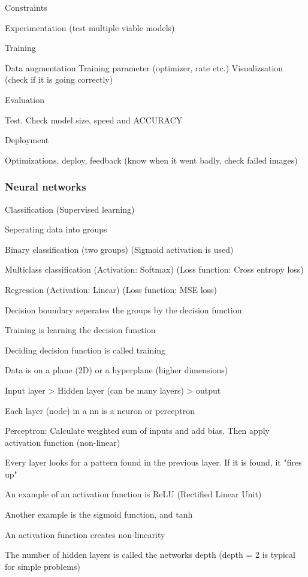 	Constraints

	Experimentation (test multiple viable models)

Training

	Data augmentation
	Training parameter (optimizer, rate etc.)
	Visualizsation (check if it is going correctly)

Evaluation
	
	Test. Check model size, speed and ACCURACY

Deployment

	Optimizations, deploy, feedback (know when it went badly, check failed images)	

\subsubsection{Neural networks}

Classification (Supervised learning)

	Seperating data into groups

	Binary classification (two groups) (Sigmoid activation is used)

	Multiclass classification (Activation: Softmax) (Loss function: Cross entropy loss)

	Regression (Activation: Linear) (Loss function: MSE loss)

	Decision boundary seperates the groups by the decision function

	Training is learning the decision function

	Deciding decision function is called training

	Data is on a plane (2D) or a hyperplane (higher dimensions)

	Input layer > Hidden layer (can be many layers) > output

	Each layer (node) in a nn is a neuron or perceptron

	Perceptron: Calculate weighted sum of inputs and add bias. Then apply activation function (non-linear)

	Every layer looks for a pattern found in the previous layer. If it is found, it "fires up"

	An example of an activation function is ReLU (Rectified Linear Unit)

	Another example is the sigmoid function, and tanh

	An activation function creates non-linearity

	The number of hidden layers is called the networks depth (depth = 2 is typical for simple problems)


